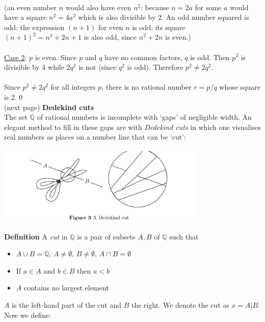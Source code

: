 \documentclass{report}
\begin{document}
\vspace{1mm}\\
(an even number $n$ would also have even $n^2$: because $n=2a$ for some $a$ would have a square $n^2=4a^2$ 
which is also divisible by 2. An odd number squared is odd: the expression $(n+1)$ for even $n$ 
is odd; its square $(n+1)^2=n^2+2n+1$ is also odd, since $n^2+2n$ is even.)\\
\vspace{1mm}\\
\underline{Case 2}: $p$ is even. Since $p$ and $q$ have no common factors, $q$ is odd. Then $p^2$ is divisible by 4
while $2q^2$ is not (since $q^2$ is odd). Therefore
$p^2\neq2q^2$.\\
\vspace{1mm}\\
Since $p^2\neq2q^2$ for all integers $p$, there is no rational number $r=p/q$ whose square is 2.\qed\\
(next page)\newpage
\noindent\textbf{Dedekind cuts}\\
The set $\mathbb{Q}$ of rational numbers is incomplete with `gaps' of negligible width. An elegant method
to fill in these gaps are with \textit{Dedekind cuts} in which one visualises real numbers as places on a number
line that can be `cut':
\begin{center}
\includegraphics[width=10cm]{1}\\
\end{center}
\textbf{Definition} A \textit{cut} in $\mathbb{Q}$ is a pair of subsets $A,B$ of $\mathbb{Q}$ such that
\begin{itemize}
\item $A\cup B=\mathbb{Q},\,A\neq\emptyset,\,B\neq\emptyset,\,A\cap B=\emptyset$
\item If $a\in A$ and $b\in B$ then $a<b$
\item $A$ contains no largest element
\end{itemize}
$A$ is the left-hand part of the cut and $B$ the right. We denote the cut as $x=A|B$. Now we define:\\
\vspace{1mm}\\
\end{document}
